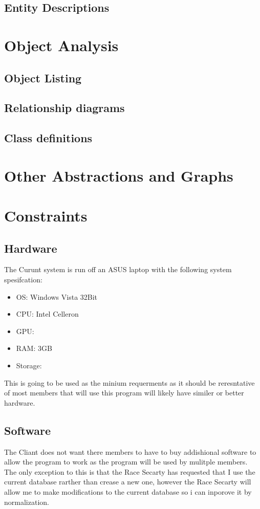\subsection{Entity Descriptions}

\section{Object Analysis}

\subsection{Object Listing}

\subsection{Relationship diagrams}

\subsection{Class definitions}

\section{Other Abstractions and Graphs}

\section{Constraints}

\subsection{Hardware}
The Curunt system is run off an ASUS laptop with the following system spesifcation:

\begin{itemize}
\item OS: Windows Vista 32Bit
\item CPU: Intel Celleron
\item GPU:
\item RAM: 3GB
\item Storage:
\end{itemize}

This is going to be used as the minium requerments as it should be reresntative of most members that will use this program will likely have similer or better hardware.
\subsection{Software}
The Cliant does not want there members to have to buy addishional software to allow the program to work as the program will be used by mulitple members. The only exception to this is that the Race Secarty has requested that I use the current database rarther than crease a new one, however the Race Secarty will allow me to make modifications to the current database so i can inporove it by normalization.
